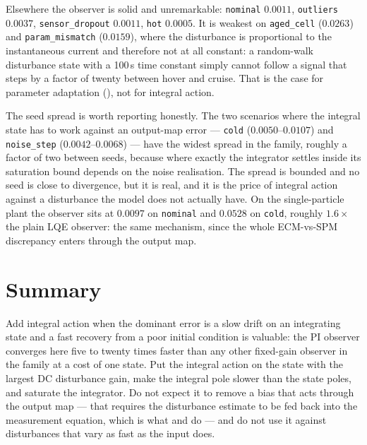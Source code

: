 Elsewhere the observer is solid and unremarkable: \texttt{nominal} $0.0011$, \texttt{outliers}
$0.0037$, \texttt{sensor\_dropout} $0.0011$, \texttt{hot} $0.0005$.  It is weakest on
\texttt{aged\_cell} ($0.0263$) and \texttt{param\_mismatch} ($0.0159$), where the disturbance is
proportional to the instantaneous current and therefore not at all constant: a random-walk
disturbance state with a 100\,s time constant simply cannot follow a signal that steps by a
factor of twenty between hover and cruise.  That is the case for parameter adaptation
(), not for integral action.

The seed spread is worth reporting honestly.  The two scenarios where the integral state has to
work against an output-map error --- \texttt{cold} ($0.0050$--$0.0107$) and \texttt{noise\_step}
($0.0042$--$0.0068$) --- have the widest spread in the family, roughly a factor of two between
seeds, because where exactly the integrator settles inside its saturation bound depends on the
noise realisation.  The spread is bounded and no seed is close to divergence, but it is real, and
it is the price of integral action against a disturbance the model does not actually have.  On
the single-particle plant the observer sits at $0.0097$ on \texttt{nominal} and $0.0528$ on
\texttt{cold}, roughly $1.6\times$ the plain LQE observer: the same mechanism, since the whole
ECM-vs-SPM discrepancy enters through the output map.

\section{Summary}
Add integral action when the dominant error is a slow drift on an integrating state and a fast
recovery from a poor initial condition is valuable: the PI observer converges here five to
twenty times faster than any other fixed-gain observer in the family at a cost of one state.  Put
the integral action on the state with the largest DC disturbance gain, make the integral pole
slower than the state poles, and saturate the integrator.  Do not expect it to remove a bias
that acts through the output map --- that requires the disturbance estimate to be fed back into
the measurement equation, which is what  and  do --- and do not use it
against disturbances that vary as fast as the input does.
